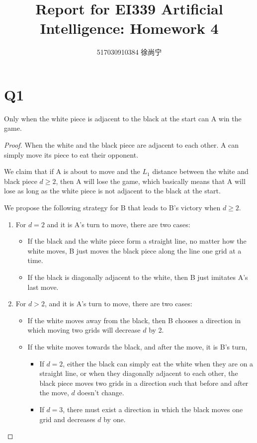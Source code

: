 \documentclass[a4paper]{article}
\title{Report for EI339 Artificial Intelligence: Homework 4}
\author{517030910384 徐尚宁}
\date{}
\theoremstyle{definition}
\begin{document}
\begin{CJK}{UTF8}{gbsn}
    \maketitle
\end{CJK}

\section*{Q1}

Only when the white piece is adjacent to the black at the start can A win the
game.

\begin{proof}
    When the white and the black piece are adjacent to each other. A can simply
    move its piece to eat their opponent.

    We claim that if A is about to move and the $L_1$ distance between the white
    and black piece $d \geq 2$, then A will lose the game, which basically means
    that A will lose as long as the white piece is not adjacent to the black at
    the start.

    We propose the following strategy for B that leads to B's victory when $d
    \geq 2$.
    \begin{enumerate}
        \item For $d = 2$ and it is A's turn to move, there are two cases:
        \begin{itemize}
            \item If the black and the white piece form a straight line, no
            matter how the white moves, B just moves the black piece along the
            line one grid at a time.
            \item If the black is diagonally adjacent to the white, then B just
            imitates A's last move.
        \end{itemize}
        \item For $d > 2$, and it is A's turn to move, there are two cases:
        \begin{itemize}
            \item If the white moves away from the black, then B chooses a
            direction in which moving two grids will decrease $d$ by 2.
            \item If the white moves towards the black, and after the move, it
            is B's turn,
            \begin{itemize}
                \item If $d = 2$, either the black can simply eat the white when
                they are on a straight line, or when they diagonally adjacent to
                each other, the black piece moves two grids in a direction such
                that before and after the move, $d$ doesn't change.
                \item If $d = 3$, there must exist a direction in which the
                black moves one grid and decreases $d$ by one.
            \end{itemize}
        \end{itemize}
    \end{enumerate}


\end{proof}
\end{document}
